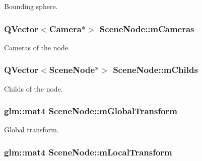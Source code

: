Bounding sphere. 

\hypertarget{class_scene_node_adcdbf0c12c63308f53ec11a7e4b141b0}{
\subsubsection[{m\+Cameras}]{\setlength{\rightskip}{0pt plus 5cm}Q\+Vector$<${\bf Camera}$\ast$$>$ Scene\+Node\+::m\+Cameras\hspace{0.3cm}{\ttfamily [private]}}}\label{class_scene_node_adcdbf0c12c63308f53ec11a7e4b141b0}


Cameras of the node. 

\hypertarget{class_scene_node_ab6fe55f9975dfdcd9007ec9cd6dd2206}{
\subsubsection[{m\+Childs}]{\setlength{\rightskip}{0pt plus 5cm}Q\+Vector$<${\bf Scene\+Node}$\ast$$>$ Scene\+Node\+::m\+Childs\hspace{0.3cm}{\ttfamily [private]}}}\label{class_scene_node_ab6fe55f9975dfdcd9007ec9cd6dd2206}


Childs of the node. 

\hypertarget{class_scene_node_a7d96b292c5b46cdc1ffeae67811ae652}{
\subsubsection[{m\+Global\+Transform}]{\setlength{\rightskip}{0pt plus 5cm}glm\+::mat4 Scene\+Node\+::m\+Global\+Transform\hspace{0.3cm}{\ttfamily [private]}}}\label{class_scene_node_a7d96b292c5b46cdc1ffeae67811ae652}


Global transform. 

\hypertarget{class_scene_node_a747578d1cb21d8ee37071cbf7d2f4218}{
\subsubsection[{m\+Local\+Transform}]{\setlength{\rightskip}{0pt plus 5cm}glm\+::mat4 Scene\+Node\+::m\+Local\+Transform\hspace{0.3cm}{\ttfamily [private]}}}\label{class_scene_node_a747578d1cb21d8ee37071cbf7d2f4218}


